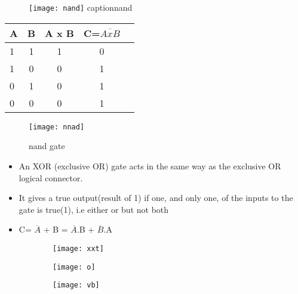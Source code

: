 \documentclass{article}
\begin{document}
\begin{figure}[h!]
	\texttt{[image: nand]}
	caption{nand}
	

\end{figure}
\begin{table}[h!]
	\begin{center}
		\begin{tabular}{|l|c|c|c|c}
			\cellcolor{blue!35}\textbf{A} & \cellcolor{blue!35}\textbf{B} & \cellcolor{blue!35}\textbf{A x B} & \cellcolor{blue!35}\textbf{C=$\overline{AxB}$}\\
			\hline
			\cellcolor{blue!15}	1 & \cellcolor{blue!15}1 & \cellcolor{blue!15}1 & \cellcolor{blue!15}0\\
			\cellcolor{blue!15}	1 & \cellcolor{blue!15} 0 & \cellcolor{blue!15}0 & \cellcolor{blue!15}1\\
			\cellcolor{blue!15}	0 & \cellcolor{blue!15}1 & \cellcolor{blue!15} 0 & 	\cellcolor{blue!15}1\\
			\cellcolor{blue!15}	0 & \cellcolor{blue!15}0 & \cellcolor{blue!15}0 & 	\cellcolor{blue!15}1\\
			\hline	
		\end{tabular}
	\end{center}
\end{table}
\begin{figure}[h!]
\texttt{[image: nnad]}
\caption{nand gate}
\end{figure}
\begin{itemize}
	\item An XOR (exclusive OR) gate acts in the same way as the exclusive OR logical connector.
	\item It gives a true output(result of 1) if one, and only one, of the inputs to the gate is true(1), i.e either or but not both
	\item C= $\overline{A}$ + B = $\overline{A}$.B + $\overline{B}$.A
\end{itemize}
\begin{figure}[h!]
	\centering
	\begin{subfigure}[h!]{0.2\linewidth}
		
	\texttt{[image: xxt]} \end{subfigure}
	\begin{subfigure}[h!]{0.2\linewidth}
		\texttt{[image: o]}
	\end{subfigure}
\begin{subfigure}[h!]{0.2\linewidth}
	\texttt{[image: vb]}
\end{subfigure}
\end{figure}
\end{document}
